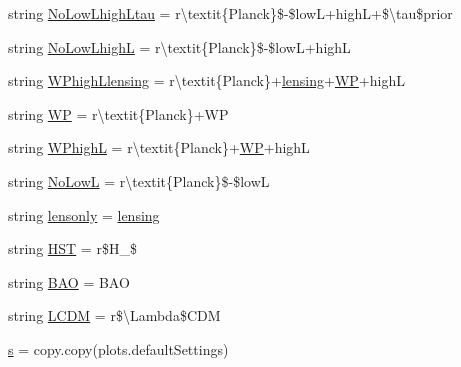 \begin{DoxyCompactItemize}
\item 
string \mbox{\hyperlink{namespaceplanckStyle_a2d46f4d4ecec3290e18e4ce749fee774}{No\+Low\+Lhigh\+Ltau}} = r\textquotesingle{}\textbackslash{}textit\{Planck\}\$-\/\$lowL+highL+\$\textbackslash{}tau\$prior\textquotesingle{}
\item 
string \mbox{\hyperlink{namespaceplanckStyle_a59fb4c4b138ab1a32d45a98829ad90dd}{No\+Low\+LhighL}} = r\textquotesingle{}\textbackslash{}textit\{Planck\}\$-\/\$lowL+highL\textquotesingle{}
\item 
string \mbox{\hyperlink{namespaceplanckStyle_acf229a727dcf8c928a13781a4d117ad0}{W\+Phigh\+Llensing}} = r\textquotesingle{}\textbackslash{}textit\{Planck\}+\mbox{\hyperlink{namespaceplanckStyle_a444ad7b6645bdd1c5221347a4aacb75b}{lensing}}+\mbox{\hyperlink{namespaceplanckStyle_a5d775e6f13fd2b985a0b85c7b83669c0}{WP}}+highL\textquotesingle{}
\item 
string \mbox{\hyperlink{namespaceplanckStyle_a5d775e6f13fd2b985a0b85c7b83669c0}{WP}} = r\textquotesingle{}\textbackslash{}textit\{Planck\}+WP\textquotesingle{}
\item 
string \mbox{\hyperlink{namespaceplanckStyle_a9a7e223059a3ac02d4011fdbcef4085a}{W\+PhighL}} = r\textquotesingle{}\textbackslash{}textit\{Planck\}+\mbox{\hyperlink{namespaceplanckStyle_a5d775e6f13fd2b985a0b85c7b83669c0}{WP}}+highL\textquotesingle{}
\item 
string \mbox{\hyperlink{namespaceplanckStyle_aa030f42c38b91a18c02e5d8cf0fcccd7}{No\+LowL}} = r\textquotesingle{}\textbackslash{}textit\{Planck\}\$-\/\$lowL\textquotesingle{}
\item 
string \mbox{\hyperlink{namespaceplanckStyle_a6af9ab09d1e0b7e2f834b8d6c2b0a1a7}{lensonly}} = \textquotesingle{}\mbox{\hyperlink{namespaceplanckStyle_a444ad7b6645bdd1c5221347a4aacb75b}{lensing}}\textquotesingle{}
\item 
string \mbox{\hyperlink{namespaceplanckStyle_aa961a23e341ddada7a762e236834fd2f}{H\+ST}} = r\textquotesingle{}\$H\+\_\$\textquotesingle{}
\item 
string \mbox{\hyperlink{namespaceplanckStyle_ace0136b498d0e4ad8836b5b0f7c9aa1c}{B\+AO}} = \textquotesingle{}B\+AO\textquotesingle{}
\item 
string \mbox{\hyperlink{namespaceplanckStyle_a4d8cba85914964f8d6c1f9ba9facd615}{L\+C\+DM}} = r\textquotesingle{}\$\textbackslash{}Lambda\$\+C\+DM\textquotesingle{}
\item 
\mbox{\hyperlink{namespaceplanckStyle_a486d7112a009bf0dee515533fa30970b}{s}} = copy.\+copy(plots.\+default\+Settings)

\end{DoxyCompactItemize}
